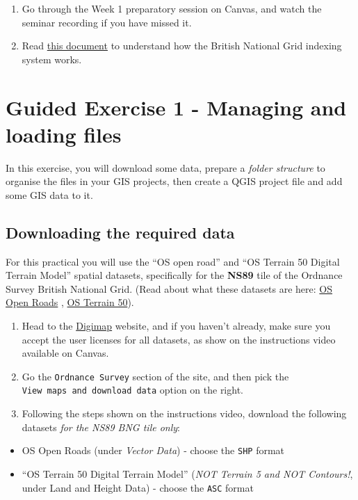 \documentclass[
  letterpaper,
  DIV=11,
  numbers=noendperiod]{scrreprt}
\providecommand{\tightlist}{%
  \setlength{\itemsep}{0pt}\setlength{\parskip}{0pt}}\usepackage{longtable,booktabs,array}
\begin{document}
\begin{enumerate}
\def\labelenumi{\arabic{enumi}.}
\item
  Go through the Week 1 preparatory session on Canvas, and watch the
  seminar recording if you have missed it.
\item
  Read
  \href{https://www.ordnancesurvey.co.uk/documents/resources/guide-to-nationalgrid.pdf}{this
  document} to understand how the British National Grid indexing system
  works.
\end{enumerate}

\section{Guided Exercise 1 - Managing and loading files}\label{GE1}

In this exercise, you will download some data, prepare a \emph{folder
structure} to organise the files in your GIS projects, then create a
QGIS project file and add some GIS data to it.

\subsection{Downloading the required
data}\label{downloading-the-required-data}

For this practical you will use the ``OS open road'' and ``OS Terrain 50
Digital Terrain Model'' spatial datasets, specifically for the
\textbf{NS89} tile of the Ordnance Survey British National Grid. (Read
about what these datasets are here:
\href{https://www.ordnancesurvey.co.uk/products/os-open-roads}{OS Open
Roads} ,
\href{https://www.ordnancesurvey.co.uk/products/os-terrain-50}{OS
Terrain 50}).

\begin{enumerate}
\def\labelenumi{(\arabic{enumi})}
\item
  Head to the \href{https://digimap.edina.ac.uk/}{Digimap} website, and
  if you haven't already, make sure you accept the user licenses for all
  datasets, as show on the instructions video available on Canvas.
\item
  Go the \texttt{Ordnance\ Survey} section of the site, and then pick
  the \texttt{View\ maps\ and\ download\ data} option on the right.
\item
  Following the steps shown on the instructions video, download the
  following datasets \emph{for the NS89 BNG tile only}:
\end{enumerate}

\begin{itemize}
\tightlist
\item
  OS Open Roads (under \emph{Vector Data}) - choose the \texttt{SHP}
  format
\item
  ``OS Terrain 50 Digital Terrain Model'' (\emph{NOT Terrain 5 and NOT
  Contours!}, under Land and Height Data) - choose the \texttt{ASC}
  format
\end{itemize}
\end{document}
